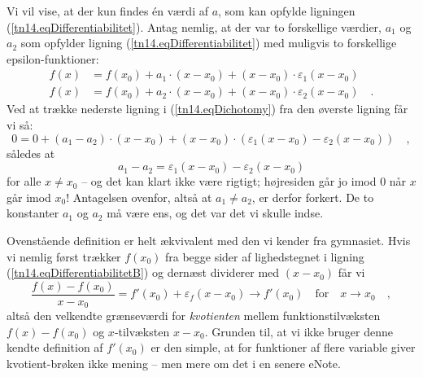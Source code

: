 \begin{explain}
Vi vil vise, at der kun findes \'{e}n værdi af $a$, som kan opfylde ligningen (\ref{tn14.eqDifferentiabilitet}). Antag nemlig, at der var to forskellige værdier, $a_{1}$ og $a_{2}$ som opfylder ligning (\ref{tn14.eqDifferentiabilitet}) med muligvis to forskellige epsilon-funktioner:
\begin{equation} \label{tn14.eqDichotomy}
\begin{aligned}
f(x) &= f(x_{0}) + a_{1}\cdot(x-x_{0}) + (x-x_{0})\cdot \varepsilon_{1}(x-x_{0}) \\
f(x) &= f(x_{0}) + a_{2}\cdot(x-x_{0}) + (x-x_{0})\cdot \varepsilon_{2}(x-x_{0}) \quad.
\end{aligned}
\end{equation}
Ved at trække nederste ligning i (\ref{tn14.eqDichotomy}) fra den øverste ligning får vi så:
\begin{equation}
0 = 0 + (a_{1} - a_{2})\cdot(x-x_{0}) + (x-x_{0})\cdot \left(\varepsilon_{1}(x-x_{0}) -  \varepsilon_{2}(x-x_{0})\right) \quad ,
\end{equation}
således at
\begin{equation}
a_{1} - a_{2} = \varepsilon_{1}(x-x_{0}) -  \varepsilon_{2}(x-x_{0})
\end{equation}
for alle $x \neq x_{0}$ -- og det kan klart ikke være rigtigt; højresiden går jo imod $0$ når $x$ går imod $x_{0}$! Antagelsen ovenfor, altså at $a_{1} \neq a_{2}$,  er derfor forkert. De to konstanter $a_{1}$ og $a_{2}$ må være ens, og det var det vi skulle indse.
\end{explain}

\begin{aha}
Ovenstående definition er helt ækvivalent med den vi kender fra gymnasiet. Hvis vi nemlig først trækker $f(x_{0})$ fra begge sider af lighedstegnet i ligning (\ref{tn14.eqDifferentiabilitetB}) og dernæst dividerer med $(x - x_{0})$   får vi
\begin{equation}
\frac{f(x) - f(x_{0})}{x - x_{0}} = f'(x_{0}) + \varepsilon_{f}(x-x_{0}) \to f'(x_{0}) \quad \textrm{for} \quad x \to x_{0} \quad ,
\end{equation}
altså den velkendte grænseværdi for \emph{kvotienten} mellem funktionstilvæksten $f(x) - f(x_{0})$ og $x$-tilvæksten $x - x_{0}$. Grunden til, at vi ikke bruger denne
kendte de\-fi\-ni\-tion af $f'(x_{0})$ er den simple, at for funktioner af flere variable giver kvotient-brøken ikke mening -- men mere om det i en senere eNote.
\end{aha}

